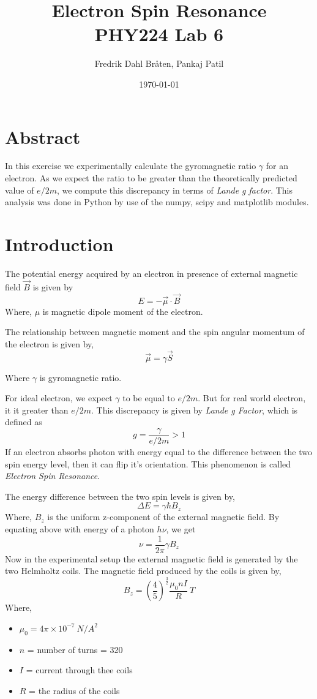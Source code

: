 \documentclass[letterpaper,12pt]{article}
\begin{document}
\title{%
Electron Spin Resonance \\
\large PHY224 Lab 6}
\author{Fredrik Dahl Bråten, Pankaj Patil}
\date{\today}
\maketitle

\section{Abstract}

In this exercise we experimentally calculate the gyromagnetic ratio $\gamma$ for an electron. 
As we expect the ratio to be greater than the theoretically predicted value of $e/2m$, 
we compute this discrepancy in terms of \emph{Lande g factor}. This analysis was done in Python by use of the numpy, scipy and matplotlib modules.

\section{Introduction}

The potential energy acquired by an electron in presence of external magnetic field $\vec{B}$ is given by
$$E = -\vec{\mu} \cdot \vec{B}$$
Where, $\mu$ is magnetic dipole moment of the electron.

The relationship between magnetic moment and the spin angular momentum of the electron is given by,
$$\vec{\mu} = \gamma \vec{S}$$

Where $\gamma$ is gyromagnetic ratio. 

For ideal electron, we expect $\gamma$ to be equal to $e/2m$. But for real world electron, it it greater than $e/2m$.
This discrepancy is given by \emph{Lande g Factor}, which is defined as
$$g = \frac{\gamma}{e/2m} > 1$$
If an electron absorbs photon with energy equal to the difference between the two spin energy level, then 
it can flip it's orientation. This phenomenon is called \emph{Electron Spin Resonance}. 

The energy difference between the two spin levels is given by,
$$\Delta E = \gamma \hbar B_z$$
Where, $B_z$ is the uniform z-component of the external magnetic field. By equating above with energy of a photon $h\nu$, we get
$$\nu = \frac{1}{2\pi}\gamma B_z$$
Now in the experimental setup the external magnetic field is generated by the two Helmholtz coils. The magnetic field produced
by the coils is given by,
$$B_z = \left(\frac{4}{5}\right)^\frac{3}{2} \frac{\mu_0 n I}{R}\ T$$
Where,
\begin{itemize}
  \item[] $\mu_0 = 4\pi \times 10^{-7}\ N/A^2$
  \item[] $n$ = number of turns = 320
  \item[] $I$ = current through thee coils
  \item[] $R$ = the radius of the coils     
\end{itemize}
\end{document}
